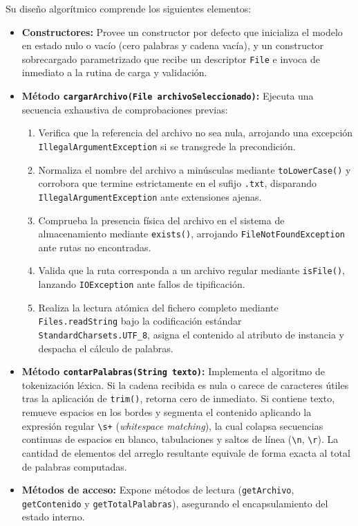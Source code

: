\documentclass[letterpaper,12pt,oneside]{article}
\numberwithin{figure}{section}
\begin{document}
Su diseño algorítmico comprende los siguientes elementos:
\begin{itemize}
  \item \textbf{Constructores:} Provee un constructor por defecto que inicializa el modelo en estado nulo o vacío (cero palabras y cadena vacía), y un constructor sobrecargado parametrizado que recibe un descriptor \texttt{File} e invoca de inmediato a la rutina de carga y validación.
  \item \textbf{Método \texttt{cargarArchivo(File archivoSeleccionado)}:} Ejecuta una secuencia exhaustiva de comprobaciones previas:
    \begin{enumerate}
      \item Verifica que la referencia del archivo no sea nula, arrojando una excepción \texttt{Illegal\-Argument\-Exception} si se transgrede la precondición.
      \item Normaliza el nombre del archivo a minúsculas mediante \texttt{toLowerCase()} y corrobora que termine estrictamente en el sufijo \texttt{.txt}, disparando \texttt{Illegal\-Argument\-Exception} ante extensiones ajenas.
      \item Comprueba la presencia física del archivo en el sistema de almacenamiento mediante \texttt{exists()}, arrojando \texttt{FileNotFound\-Exception} ante rutas no encontradas.
      \item Valida que la ruta corresponda a un archivo regular mediante \texttt{isFile()}, lanzando \texttt{IOException} ante fallos de tipificación.
      \item Realiza la lectura atómica del fichero completo mediante \texttt{Files.\-readString} bajo la codificación estándar \texttt{Standard\-Charsets.\-UTF\_8}, asigna el contenido al atributo de instancia y despacha el cálculo de palabras.
    \end{enumerate}
  \item \textbf{Método \texttt{contarPalabras(String texto)}:} Implementa el algoritmo de tokenización léxica. Si la cadena recibida es nula o carece de caracteres útiles tras la aplicación de \texttt{trim()}, retorna cero de inmediato. Si contiene texto, remueve espacios en los bordes y segmenta el contenido aplicando la expresión regular \verb|\s+| (\textit{whitespace matching}), la cual colapsa secuencias continuas de espacios en blanco, tabulaciones y saltos de línea (\verb|\n|, \verb|\r|). La cantidad de elementos del arreglo resultante equivale de forma exacta al total de palabras computadas.
  \item \textbf{Métodos de acceso:} Expone métodos de lectura (\texttt{getArchivo}, \texttt{getContenido} y \texttt{getTotalPalabras}), asegurando el encapsulamiento del estado interno.
\end{itemize}
\end{document}
